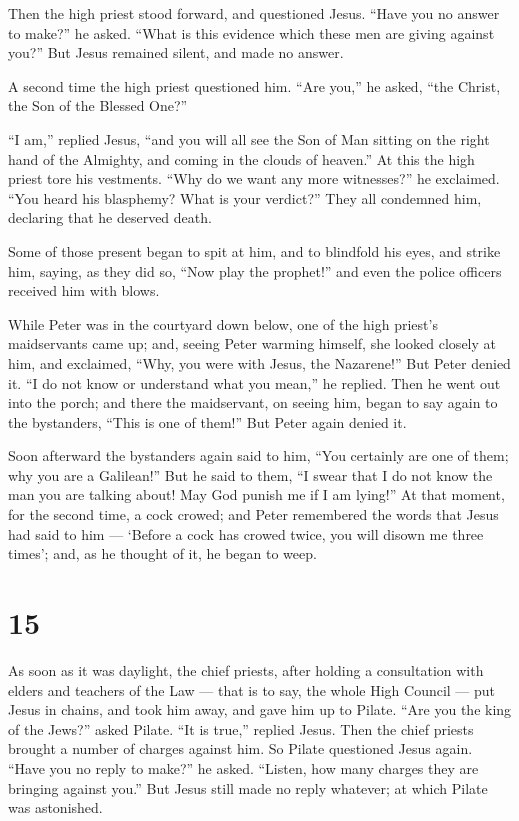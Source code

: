  Then the high priest stood forward, and questioned Jesus.
``Have you no answer to make?'' he asked. ``What is this evidence which
these men are giving against you?''  But Jesus remained
silent, and made no answer.

A second time the high priest questioned him. ``Are you,'' he asked,
``the Christ, the Son of the Blessed One?''

 ``I am,'' replied Jesus, ``and you will all see the Son of
Man sitting on the right hand of the Almighty, and coming in the clouds
of heaven.''  At this the high priest tore his vestments.
``Why do we want any more witnesses?'' he exclaimed.  ``You
heard his blasphemy? What is your verdict?'' They all condemned him,
declaring that he deserved death.

 Some of those present began to spit at him, and to
blindfold his eyes, and strike him, saying, as they did so, ``Now play
the prophet!'' and even the police officers received him with blows.

 While Peter was in the courtyard down below, one of the
high priest's maidservants came up;  and, seeing Peter
warming himself, she looked closely at him, and exclaimed, ``Why, you
were with Jesus, the Nazarene!''  But Peter denied it. ``I
do not know or understand what you mean,'' he replied. Then he went out
into the porch;  and there the maidservant, on seeing him,
began to say again to the bystanders, ``This is one of them!''
 But Peter again denied it.

Soon afterward the bystanders again said to him, ``You certainly are one
of them; why you are a Galilean!''  But he said to them,
``I swear that I do not know the man you are talking about! May God
punish me if I am lying!''  At that moment, for the second
time, a cock crowed; and Peter remembered the words that Jesus had said
to him --- `Before a cock has crowed twice, you will disown me three
times'; and, as he thought of it, he began to weep.

\hypertarget{section-14}{%
\section{15}\label{section-14}}

 As soon as it was daylight, the chief priests, after
holding a consultation with elders and teachers of the Law --- that is
to say, the whole High Council --- put Jesus in chains, and took him
away, and gave him up to Pilate.  ``Are you the king of the
Jews?'' asked Pilate. ``It is true,'' replied Jesus.  Then
the chief priests brought a number of charges against him. 
So Pilate questioned Jesus again. ``Have you no reply to make?'' he
asked. ``Listen, how many charges they are bringing against you.''
 But Jesus still made no reply whatever; at which Pilate was
astonished.

